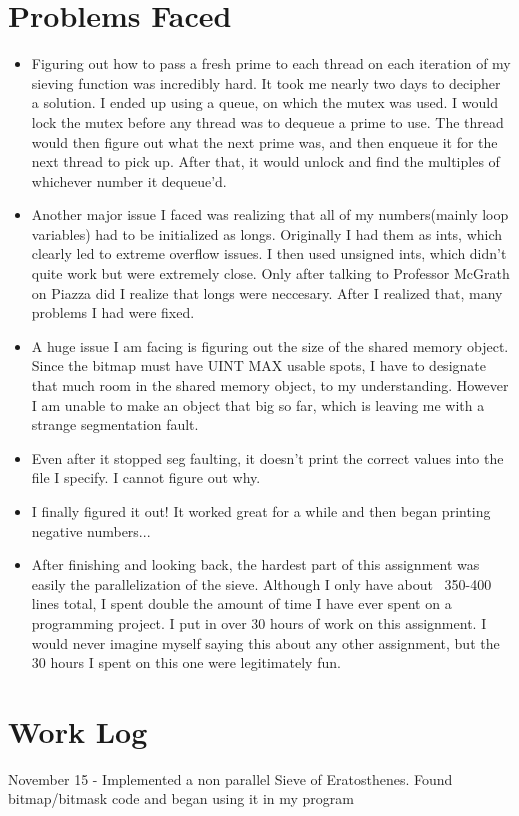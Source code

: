 \documentclass[letterpaper,10pt,titlepage,fleqn]{article}
\begin{document}
\section*{Problems Faced}
\begin{itemize}
\item Figuring out how to pass a fresh prime to each thread on each iteration of my sieving function was incredibly hard. It took me nearly two days to decipher a solution. I ended up using a queue, on which the mutex was used. I would lock the mutex before any thread was to dequeue a prime to use. The thread would then figure out what the next prime was, and then enqueue it for the next thread to pick up. After that, it would unlock and find the multiples of whichever number it dequeue'd.
\item  Another major issue I faced was realizing that all of my numbers(mainly loop variables) had to be initialized as longs. Originally I had them as ints, which clearly led to extreme overflow issues. I then used unsigned ints, which didn't quite work but were extremely close. Only after talking to Professor McGrath on Piazza did I realize that longs were neccesary. After I realized that, many problems I had were fixed.
\item A huge issue I am facing is figuring out the size of the shared memory object. Since the bitmap must have UINT MAX usable spots, I have to designate that much room in the shared memory object, to my understanding. However I am unable to make an object that big so far, which is leaving me with a strange segmentation fault. 
\item Even after it stopped seg faulting, it doesn't print the correct values into the file I specify. I cannot figure out why.
\item I finally figured it out! It worked great for a while and then began printing negative numbers... 
\item After finishing and looking back, the hardest part of this assignment was easily the parallelization of the sieve. Although I only have about ~350-400 lines total, I spent double the amount of time I have ever spent on a programming project. I put in over 30 hours of work on this assignment. I would never imagine myself saying this about any other assignment, but the 30 hours I spent on this one were legitimately fun.
\end{itemize}

\section*{Work Log}
November 15 - Implemented a non parallel Sieve of Eratosthenes. Found bitmap/bitmask code and began using it in my program
\end{document}
